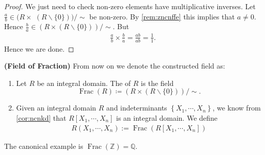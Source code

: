 \documentclass{article}
\newcommand{\bfs}[1]{\textbf{({#1}) }}
\newcommand{\Frac}{\operatorname{Frac}}
\begin{document}
\begin{proof}
We just need to check non-zero elements have multiplicative inverses. Let $\frac{a}{b} \in(R \times$ $(R \backslash\{0\})) / \sim$ be non-zero. By \cref{rem:zncnffe} this implies that $a \neq 0$. Hence $\frac{b}{a} \in(R \times(R \backslash\{0\})) / \sim$. But
\begin{align*}
\frac{a}{b} \times \frac{b}{a}=\frac{a b}{a b}=\frac{1}{1} .
\end{align*}
Hence we are done. 
\end{proof}
\begin{defa}\bfs{Field of Fraction}From now on we denote the constructed field as:
\begin{enumerate}
    \item Let $R$ be an integral domain. The  of $R$ is the field 
    $$\Frac(R)\coloneqq(R \times(R \backslash\{0\})) / \sim.$$
    \item Given an integral domain $R$ and indeterminants $\left\{X_{1}, \cdots, X_{n}\right\}$, we know from \cref{cor:ncnkd} that $R\left[X_{1}, \cdots, X_{n}\right]$ is an integral domain. We define
\begin{align*}
R\left(X_{1}, \cdots, X_{n}\right):=\operatorname{Frac}\left(R\left[X_{1}, \cdots, X_{n}\right]\right)
\end{align*}
\end{enumerate}
\end{defa}
\begin{exma}
The canonical example is $\operatorname{Frac}(\mathbb{Z})=\mathbb{Q}$.
\end{exma}
\end{document}
